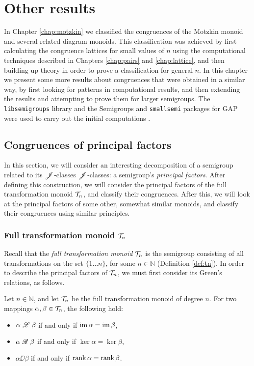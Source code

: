 \chapter{Other results}
\label{chap:other}

In Chapter \ref{chap:motzkin} we classified the congruences of the Motzkin
monoid and several related diagram monoids.  This classification was achieved by
first calculating the congruence lattices for small values of $n$ using the
computational techniques described in Chapters \ref{chap:pairs} and
\ref{chap:lattice}, and then building up theory in order to prove a
classification for general $n$.  In this chapter we present some more results
about congruences that were obtained in a similar way, by first looking for
patterns in computational results, and then extending the results and attempting
to prove them for larger semigroups.  The \texttt{libsemigroups} library and the
Semigroups and \texttt{smallsemi} packages for GAP were used to carry out the
initial computations \cite{libsemigroups, semigroups, smallsemi, gap}.

\section{Congruences of principal factors}
\label{sec:princfact}

In this section, we will consider an interesting decomposition of a semigroup
related to its $\mathscr{J}$-classes $\mathrel{\mathscr{J}}$-classes: a semigroup's \textit{principal
  factors}.  After defining this construction, we will consider the principal
factors of the full transformation monoid $\mathcal{T}_n$, and classify their
congruences.
After this, we will look at the principal factors of some other, somewhat
similar monoids, and classify their congruences using similar principles.

\subsection{Full transformation monoid $\mathcal{T}_n$}
\label{sec:princfact-tn}

Recall that the \textit{full transformation monoid} $\mathcal{T}_n$ is the semigroup
consisting of all transformations on the set $\{1 \dots n\}$, for some
$n \in \mathbb{N}$ (Definition \ref{def:tn}).  In order to describe the
principal factors of $\mathcal{T}_n$, we must first consider its Green's relations, as
follows.

\begin{proposition}
  \label{prop:tn-greens}
  Let $n \in \mathbb{N}$, and let $\mathcal{T}_n$ be the full transformation monoid of
  degree $n$.  For two mappings $\alpha, \beta \in \mathcal{T}_n$, the following hold:
  \begin{itemize}
  \item $\alpha \mathrel{\mathscr{L}} \beta$ if and only if $\operatorname{im} \alpha = \operatorname{im} \beta$,
  \item $\alpha \mathrel{\mathscr{R}} \beta$ if and only if $\ker \alpha = \ker \beta$,
  \item $\alpha \DD \beta$ if and only if $\operatorname{rank} \alpha = \operatorname{rank} \beta$.
  \end{itemize}
\end{proposition}

